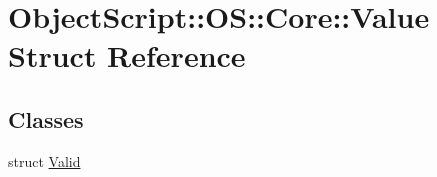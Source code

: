 \hypertarget{struct_object_script_1_1_o_s_1_1_core_1_1_value}{}\section{Object\+Script\+:\+:OS\+:\+:Core\+:\+:Value Struct Reference}
\label{struct_object_script_1_1_o_s_1_1_core_1_1_value}
\subsection*{Classes}
\begin{DoxyCompactItemize}
\item 
struct \hyperlink{struct_object_script_1_1_o_s_1_1_core_1_1_value_1_1_valid}{Valid}
\end{DoxyCompactItemize}
